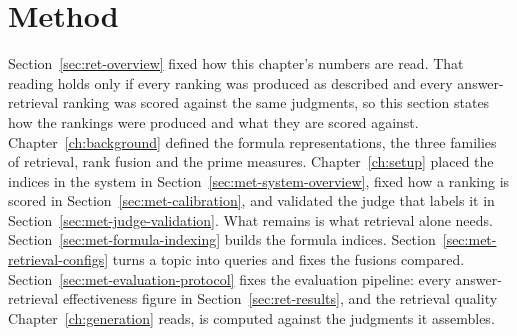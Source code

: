 \section{Method}\label{sec:ret-method}

Section~\ref{sec:ret-overview} fixed how this chapter's numbers are read. That reading
holds only if every ranking was produced as described and every answer-retrieval ranking was
scored against the same judgments, so this section states how the rankings were produced and what
they are scored against. Chapter~\ref{ch:background} defined the formula representations,
the three families of retrieval, rank fusion and the prime measures.
Chapter~\ref{ch:setup} placed the indices in the system in
Section~\ref{sec:met-system-overview}, fixed how a ranking is scored in
Section~\ref{sec:met-calibration}, and validated the judge that labels it in
Section~\ref{sec:met-judge-validation}. What remains is what retrieval alone needs.
Section~\ref{sec:met-formula-indexing} builds the formula indices.
Section~\ref{sec:met-retrieval-configs} turns a topic into queries and fixes the fusions
compared. Section~\ref{sec:met-evaluation-protocol} fixes the evaluation pipeline: every
answer-retrieval effectiveness figure in
Section~\ref{sec:ret-results}, and the retrieval quality Chapter~\ref{ch:generation}
reads, is computed against the judgments it assembles.

